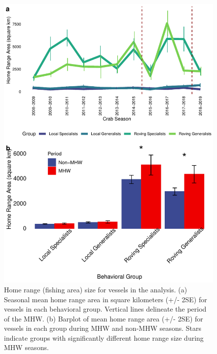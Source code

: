 \documentclass[]{elsarticle} %
\begin{document}
\begin{figure}%
\includegraphics[width=\linewidth]{fig_homerange.pdf}
\caption{Home range (fishing area) size for vessels in the analysis. (a) Seasonal mean home range area in square kilometers (+/- 2SE) for vessels in each behavioral group. Vertical lines delineate the period of the MHW. (b) Barplot of mean home range area (+/- 2SE) for vessels in each group during MHW and non-MHW seasons. Stars indicate groups with significantly different home range size during MHW seasons.}
\label{fig:homerange}
\end{figure}
\end{document}
